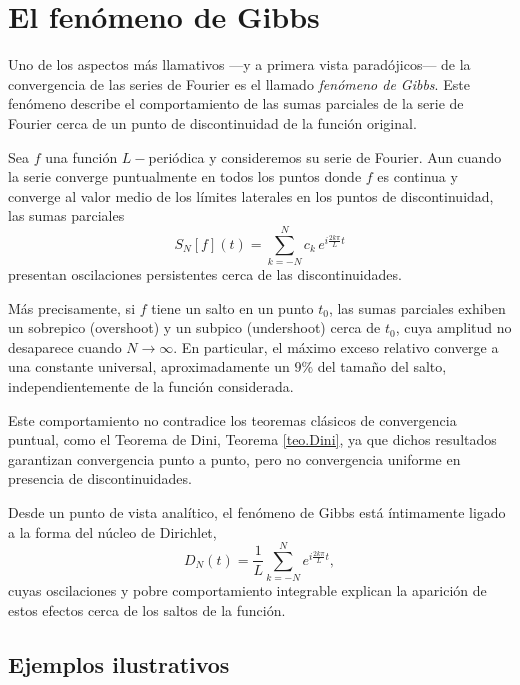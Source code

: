 \documentclass[12pt, a4paper]{amsbook}
\theoremstyle{remark}
\theoremstyle{definition}
\numberwithin{section}{chapter}
\numberwithin{subsection}{section}
\numberwithin{equation}{section}
\numberwithin{figure}{chapter}
\begin{document}
\section{El fenómeno de Gibbs}

Uno de los aspectos más llamativos —y a primera vista paradójicos— de la convergencia de las series de Fourier es el llamado \emph{fenómeno de Gibbs}. Este fenómeno describe el comportamiento de las sumas parciales de la serie de Fourier cerca de un punto de discontinuidad de la función original.

Sea $f$ una función $L-$periódica y consideremos su serie de Fourier. Aun cuando la serie converge puntualmente en todos los puntos donde $f$ es continua y converge al valor medio de los límites laterales en los puntos de discontinuidad, las sumas parciales
$$
S_N[f](t) = \sum_{k=-N}^N c_k\, e^{i \frac{2k\pi}{L} t}
$$
presentan oscilaciones persistentes cerca de las discontinuidades.

Más precisamente, si $f$ tiene un salto en un punto $t_0$, las sumas parciales exhiben un sobrepico (overshoot) y un subpico (undershoot) cerca de $t_0$, cuya amplitud no desaparece cuando $N \to \infty$. En particular, el máximo exceso relativo converge a una constante universal, aproximadamente un $9\%$ del tamaño del salto, independientemente de la función considerada.

Este comportamiento no contradice los teoremas clásicos de convergencia puntual, como el Teorema de Dini, Teorema \ref{teo.Dini}, ya que dichos resultados garantizan convergencia punto a punto, pero no convergencia uniforme en presencia de discontinuidades.

Desde un punto de vista analítico, el fenómeno de Gibbs está íntimamente ligado a la forma del núcleo de Dirichlet,
$$
D_N(t) = \frac{1}{L}\sum_{k=-N}^N e^{i \frac{2k\pi}{L} t},
$$
cuyas oscilaciones y pobre comportamiento integrable explican la aparición de estos efectos cerca de los saltos de la función.

\subsection{Ejemplos ilustrativos}
\end{document}
